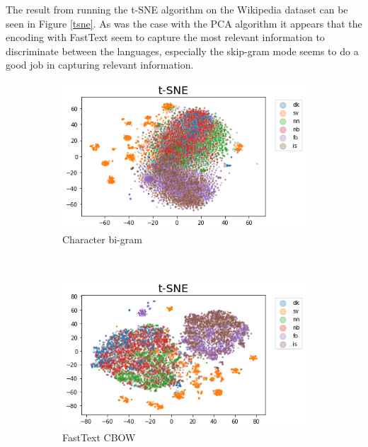 The result from running the t-SNE algorithm on the Wikipedia dataset can be seen in Figure \ref{tsne}. As was the case with the PCA algorithm it appears that the encoding with FastText seem to capture the most relevant information to discriminate between the languages, especially the skip-gram mode seems to do a good job in capturing relevant information.\\

\begin{figure}[h!]
    \centering
    \begin{subfigure}[b]{0.47\textwidth}
        \includegraphics[width=\textwidth]{figs/tsnechar2}
        \caption{Character bi-gram}
    \end{subfigure}
    ~
    \begin{subfigure}[b]{0.47\textwidth}
        \includegraphics[width=\textwidth]{figs/tsnecbow1}
        \caption{FastText CBOW}
    \end{subfigure}
    ~
    \begin{subfigure}[b]{0.47\textwidth}

\end{subfigure}
\end{figure}
